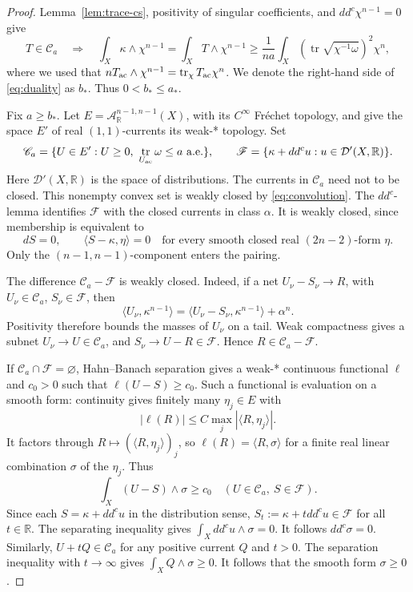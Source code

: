 \documentclass[reqno]{amsart}
\numberwithin{equation}{section}
\theoremstyle{definition}
\DeclareMathOperator{\tr}{tr}
\newcommand{\ddc}{dd^c}
\newcommand{\R}{\mathbb R}
\begin{document}
\begin{proof}
Lemma~\ref{lem:trace-cs}, positivity of singular coefficients, and $dd^c\chi^{n-1}=0$ give
\[
 T\in\mathcal C_a\quad\Longrightarrow\quad
 \int_X\kappa\wedge\chi^{n-1}
 =\int_XT\wedge\chi^{n-1}
 \ge\frac1{na}\int_X(\tr\sqrt{\chi^{-1}\omega})^2\chi^n,
\]where we used that $nT_{\rm ac}\wedge\chi^{n-1}=\tr_{\chi}T_{\rm ac}\chi^n$.
We denote the right-hand side of \eqref{eq:duality} as $b_*$. 
Thus $0<b_*\le a_*$.

Fix $a\ge b_*$. Let $E=\mathcal A^{n-1,n-1}_{\mathbb R}(X)$, with its $C^\infty$ Fr\'echet topology, and give the space $E'$ of real $(1,1)$-currents its weak-* topology. Set
\[
 \mathscr C_a=\{U\in E':U\ge0,\ \tr_{U_{\rm ac}}\omega\le a\text{ a.e.}\},
 \qquad
 \mathscr F=\{\kappa+dd^cu:u\in\mathcal D'(X,\mathbb R)\}.
\] Here $\mathcal{D}'(X,\R)$ is the space of distributions. 
The currents in $\mathscr C_a$ need not to be closed. This nonempty convex set is weakly closed by \eqref{eq:convolution}. The $dd^c$-lemma identifies $\mathscr F$ with the closed currents in class $\alpha$. It is weakly closed, since membership is equivalent to
\[
 dS=0,\qquad \langle S-\kappa,\eta\rangle=0
 \quad\text{for every smooth closed real }(2n-2)\text{-form }\eta.
\]
Only the $(n-1,n-1)$-component enters the pairing.

The difference $\mathscr C_a-\mathscr F$ is weakly closed. Indeed, if a net $U_\nu-S_\nu\to R$, with $U_\nu\in\mathscr C_a$, $S_\nu\in\mathscr F$, then
\[
 \langle U_\nu,\kappa^{n-1}\rangle
 =\langle U_\nu-S_\nu,\kappa^{n-1}\rangle+\alpha^n.
\]
Positivity therefore bounds the masses of $U_\nu$ on a tail. Weak compactness gives a subnet $U_\nu\to U\in\mathscr C_a$, and $S_\nu\to U-R\in\mathscr F$. Hence $R\in\mathscr C_a-\mathscr F$.

If $\mathscr C_a\cap\mathscr F=\varnothing$, Hahn--Banach separation gives a weak-* continuous functional $\ell$ and $c_0>0$ such that $\ell(U-S)\ge c_0$. Such a functional is evaluation on a smooth form: continuity gives finitely many $\eta_j\in E$ with
\[
 |\ell(R)|\le C\max_j|\langle R,\eta_j\rangle|.
\]
It factors through $R\mapsto(\langle R,\eta_j\rangle)_j$, so $\ell(R)=\langle R,\sigma\rangle$ for a finite real linear combination $\sigma$ of the $\eta_j$. Thus
\[
 \int_X(U-S)\wedge\sigma\ge c_0
 \quad(U\in\mathscr C_a,\ S\in\mathscr F).
\]
Since each $S=\kappa+\ddc u$ in the distribution sense, $S_t:=\kappa+t\ddc u\in \mathscr{F}$ for all $t\in \R$. The separating inequality gives $\int_X\ddc u\wedge\sigma=0$. It follows $\ddc\sigma=0.$
Similarly, $U+tQ\in \mathscr{C}_a$ for any positive current $Q$ and $t>0$. The separation inequality with $t\to \infty$ gives $\int_XQ\wedge\sigma\geq 0$. It follows that the smooth form $\sigma\geq 0$. 


\end{proof}
\end{document}
